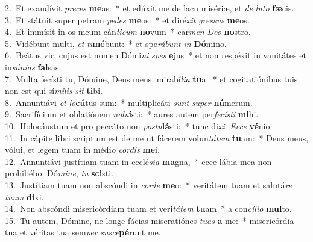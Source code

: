 {2.~}Et exaudívit \textit{pre}\textit{ces} \textbf{me}as:~* et edúxit me de lacu misériæ, et \textit{de} \textit{lu}\textit{to} \textbf{fæ}cis.\\
{3.~}Et státuit super petram \textit{pe}\textit{des} \textbf{me}os:~* et diré\textit{xit} \textit{gres}\textit{sus} \textbf{me}os.\\
{4.~}Et immísit in os meum cán\textit{ti}\textit{cum} \textbf{no}vum~* car\textit{men} \textit{De}\textit{o} \textbf{no}stro.\\
{5.~}Vidébunt multi, \textit{et} \textit{ti}\textbf{mé}bunt:~* et spe\textit{rá}\textit{bunt} \textit{in} \textbf{Dó}mino.\\
{6.~}Beátus vir, cujus est nomen Dómi\textit{ni} \textit{spes} \textbf{e}jus~* et non respéxit in vanitátes et in\textit{sá}\textit{ni}\textit{as} \textbf{fal}sas.\\
{7.~}Multa fecísti tu, Dómine, Deus meus, mirabí\textit{li}\textit{a} \textbf{tu}a:~* et cogitatiónibus tuis non est qui sí\textit{mi}\textit{lis} \textit{sit} \textbf{ti}bi.\\
{8.~}Annuntiávi \textit{et} \textit{lo}\textbf{cú}tus sum:~* multiplicáti \textit{sunt} \textit{su}\textit{per} \textbf{nú}merum.\\
{9.~}Sacrifícium et oblatiónem \textit{no}\textit{lu}\textbf{í}sti:~* aures autem per\textit{fe}\textit{cí}\textit{sti} \textbf{mi}hi.\\
{10.~}Holocáustum et pro peccáto non \textit{po}\textit{stu}\textbf{lá}sti:~* tunc di\textit{xi}: \textit{Ec}\textit{ce} \textbf{vé}nio.\\
{11.~}In cápite libri scriptum est de me ut fácerem volun\textit{tá}\textit{tem} \textbf{tu}am:~* Deus meus, vólui, et legem tuam in médi\textit{o} \textit{cor}\textit{dis} \textbf{me}i.\\
{12.~}Annuntiávi justítiam tuam in ecclé\textit{si}\textit{a} \textbf{ma}gna,~* ecce lábia mea non prohibébo: Dó\textit{mi}\textit{ne}, \textit{tu} \textbf{sci}sti.\\
{13.~}Justítiam tuam non abscóndi in \textit{cor}\textit{de} \textbf{me}o:~* veritátem tuam et salutá\textit{re} \textit{tu}\textit{um} \textbf{di}xi.\\
{14.~}Non abscóndi misericórdiam tuam et veri\textit{tá}\textit{tem} \textbf{tu}am~* a con\textit{cí}\textit{li}\textit{o} \textbf{mul}to.\\
{15.~}Tu autem, Dómine, ne longe fácias miseratiónes \textit{tu}\textit{as} \textbf{a} me:~* misericórdia tua et véritas tua sem\textit{per} \textit{su}\textit{sce}\textbf{pé}runt me.\\
